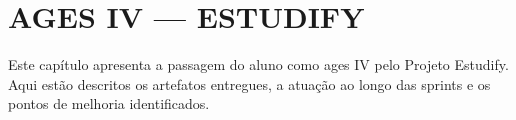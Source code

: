 \chapter[AGES IV --- Estudify]{AGES IV --- ESTUDIFY}

Este capítulo apresenta a passagem do aluno como \ac{ages} IV pelo Projeto Estudify. Aqui estão descritos os artefatos entregues, a atuação ao longo das sprints e os pontos de melhoria identificados.





